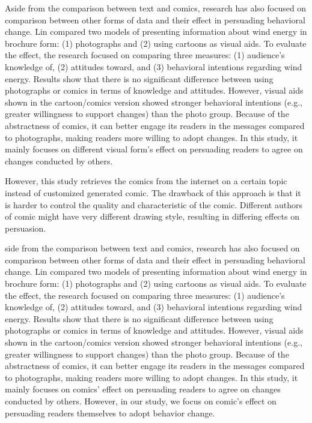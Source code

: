 Aside from the comparison between text and comics, research has also focused on comparison between other forms of data and their effect in persuading behavioral change. Lin \cite{lin2013impact} compared two models of presenting information about wind energy in brochure form: (1) photographs and (2) using cartoons as visual aids. To evaluate the effect, the research focused on comparing three measures: (1) audience's knowledge of, (2) attitudes toward, and (3) behavioral intentions regarding wind energy. Results show that there is no significant difference between using photographs or comics in terms of knowledge and attitudes. However, visual aids shown in the cartoon/comics version showed stronger behavioral intentions (e.g., greater willingness to support changes) than the photo group. Because of the abstractness of comics, it can better engage its readers in the messages compared to photographs, making readers more willing to adopt changes. In this study, it mainly focuses on different visual form's effect on persuading readers to agree on changes conducted by others.

However, this study retrieves the comics from the internet on a certain topic instead of customized generated comic. The drawback of this approach is that it is harder to control the quality and characteristic of the comic. Different authors of comic might have very different drawing style, resulting in differing effects on persuasion.

side from the comparison between text and comics, research has also focused on comparison between other forms of data and their effect in persuading behavioral change. Lin compared two models of presenting information about wind energy in brochure form: (1) photographs and (2) using cartoons as visual aids. To evaluate the effect, the research focused on comparing three measures: (1) audience's knowledge of, (2) attitudes toward, and (3) behavioral intentions regarding wind energy. Results show that there is no significant difference between using photographs or comics in terms of knowledge and attitudes. However, visual aids shown in the cartoon/comics version showed stronger behavioral intentions (e.g., greater willingness to support changes) than the photo group. Because of the abstractness of comics, it can better engage its readers in the messages compared to photographs, making readers more willing to adopt changes. In this study, it mainly focuses on comics' effect on persuading readers to agree on changes conducted by others. However, in our study, we focus on comic's effect on persuading readers themselves to adopt behavior change.\par

